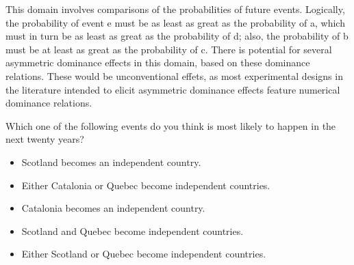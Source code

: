 This domain involves comparisons of the probabilities of future events.
Logically, the probability of event e must be as least as great as the probability of a, which must in turn be as least as great as the probability of d; also, the probability of b must be at least as great as the probability of c.
There is potential for several asymmetric dominance effects in this domain, based on these dominance relations.
These would be unconventional effets, as most experimental designs in the literature intended to elicit asymmetric dominance effects feature numerical dominance relations.

\begin{tcolorbox}
Which one of the following events do you think is most likely to happen in the next twenty years?

\begin{itemize}
	\setlength\itemsep{-5pt}
	\item Scotland becomes an independent country.
	\item Either Catalonia or Quebec become independent countries.
	\item Catalonia becomes an independent country.
	\item Scotland and Quebec become independent countries.
	\item Either Scotland or Quebec become independent countries.
\end{itemize}
\end{tcolorbox}
